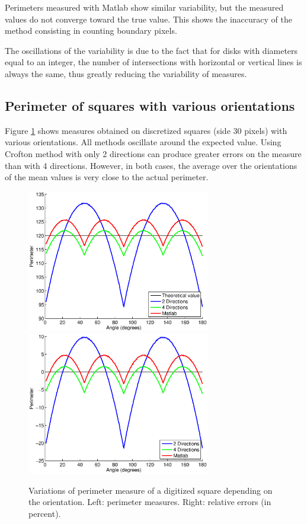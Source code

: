 \documentclass{InsightArticle}
\begin{document}
Perimeters measured with Matlab show similar variability, but the measured values do not
converge toward the true value. This shows the inaccuracy of the method consisting in
counting boundary pixels.

The oscillations of the variability is due to the fact that for disks with diameters equal to an
integer, the number of intersections with horizontal or vertical lines is always the same, 
thus greatly reducing the variability of measures. 

\subsection{Perimeter of squares with various orientations}

Figure \ref{fig:MeasureSquareOriented} shows measures obtained on discretized squares (side 30 pixels)
with various orientations. All methods oscillate around the expected value. 
Using Crofton method with only 2 directions can produce greater errors on the measure than with 4 
directions. However, in both cases, the average over the orientations of the mean values is very close 
to the actual perimeter.

\begin{figure}[!htb]
\begin{center}
\includegraphics[width=8cm]{images/perimRotatedSquares}
\includegraphics[width=8cm]{images/errorRotatedSquares}
\end{center}
\caption{Variations of perimeter measure of a digitized square depending on the orientation. 
Left: perimeter measures. Right: relative errors (in percent).}
\label{fig:MeasureSquareOriented}
\end{figure}
\end{document}
